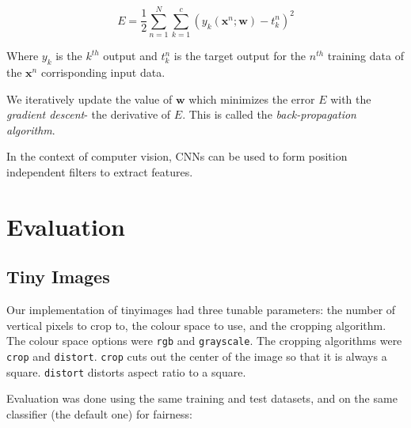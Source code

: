 \documentclass{article}
\begin{document}
\begin{multicols}{2}
\begin{equation}
	E = \frac{1}{2} \sum^{N}_{n=1} \sum^{c}_{k=1} (y_{k} (\textbf{x}^{n}; \textbf{w}) - t_{k}^{n})^2
\end{equation}

Where $y_k$ is the $k^{th}$ output and $t_{k}^{n}$ is the target output for the $n^{th}$ training data of the $\textbf{x}^{n}$ corrisponding input data.

We iteratively update the value of $\textbf{w}$ which minimizes the error $E$ with the \textit{gradient descent}- the derivative of $E$. This is called the \textit{back-propagation algorithm}.

In the context of computer vision, CNNs can be used to form position independent filters to extract features. 

\section{Evaluation}
\subsection{Tiny Images}
Our implementation of tinyimages had three tunable parameters: the number of vertical pixels to crop to, the colour space to use, and the cropping algorithm. The colour space options were \texttt{rgb} and \texttt{grayscale}. The cropping algorithms were \texttt{crop} and \texttt{distort}. \texttt{crop} cuts out the center of the image so that it is always a square. \texttt{distort} distorts aspect ratio to a square.

Evaluation was done using the same training and test datasets, and on the same classifier (the default one) for fairness:


\end{multicols}
\end{document}
